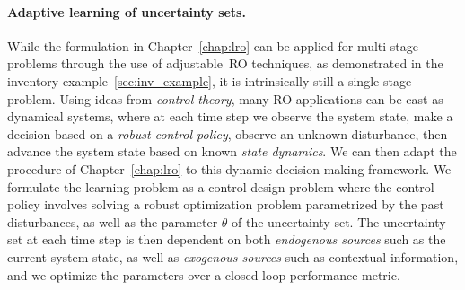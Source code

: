 

\paragraph{Adaptive learning of uncertainty sets.}
While the formulation in Chapter~\ref{chap:lro} can be applied for multi-stage problems through the use of adjustable~\gls{RO} techniques, as demonstrated in the inventory example~\ref{sec:inv_example}, it is intrinsically still a single-stage problem. 
Using ideas from {\it control theory}, many \gls{RO} applications can be cast as dynamical systems, where at each time step we observe the system state, make a decision based on a {\it robust control policy}, observe an unknown disturbance, then advance the system state based on known {\it state dynamics}. 
We can then adapt the procedure of Chapter~\ref{chap:lro} to this dynamic decision-making framework. 
We formulate the learning problem as a control design problem where the control policy involves solving a robust optimization problem parametrized by the past disturbances, as well as the parameter $\theta$ of the uncertainty set.
The uncertainty set at each time step is then dependent on both {\it endogenous sources} such as the current system state, as well as {\it exogenous sources} such as contextual information, and we optimize the parameters over a closed-loop performance metric. 

